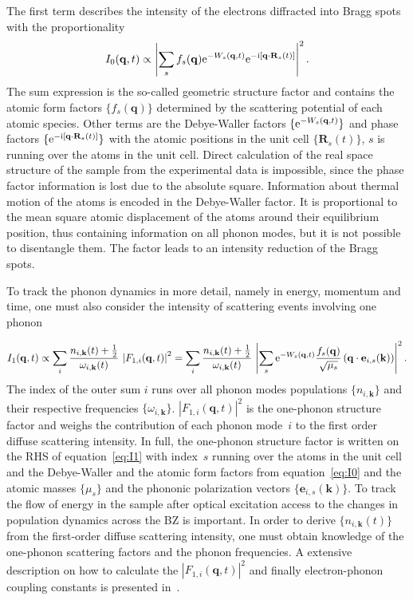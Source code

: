 The first term describes the intensity of the electrons diffracted into Bragg spots with the proportionality
\begin{equation} I_0(\mathbf{q}, t) \propto \left| \sum_s f_s(\mathbf{q}) \mathrm{e}^{-W_s(\mathbf{q},t)} \mathrm{e}^{-\mathrm{i}[\mathbf{q}\cdot\mathbf{R}_s(t)]} \right| ^2.\label{eq:I0}\end{equation}
The sum expression is the so-called geometric structure factor and contains the atomic form factors $\{f_s(\mathbf{q})\}$ determined by the scattering potential of each atomic species.
Other terms are the Debye-Waller factors $\{\mathrm{e}^{-W_s(\mathbf{q},t)}\}$ and phase factors $\{\mathrm{e}^{-\mathrm{i}[\mathbf{q}\cdot\mathbf{R}_s(t)]}\}$ with the atomic positions in the unit cell $\{\mathbf{R}_s(t)\}$, $s$ is running over the atoms in the unit cell.
Direct calculation of the real space structure of the sample from the experimental data is impossible, since the phase factor information is lost due to the absolute square.
Information about thermal motion of the atoms is encoded in the Debye-Waller factor.
It is proportional to the mean square atomic displacement of the atoms around their equilibrium position, thus containing information on all phonon modes, but it is not possible to disentangle them.
The factor leads to an intensity reduction of the Bragg spots.

To track the phonon dynamics in more detail, namely in energy, momentum and time, one must also consider the intensity of scattering events involving one phonon

\begin{equation} I_1(\mathbf{q},t) \propto \sum_i \frac{n_{i,\mathbf{k}}(t)+\frac{1}{2}}{\omega_{i,\mathbf{k}}(t)}\,\left| F_{1,i}(\mathbf{q},t) \right|^2 = \sum_i \frac{n_{i,\mathbf{k}}(t)+\frac{1}{2}}{\omega_{i,\mathbf{k}}(t)}\,\left| \sum_s \mathrm{e}^{-W_s(\mathbf{q},t)} \frac{f_s(\mathbf{q})}{\sqrt{\mu_s}} \left( \mathbf{q}\cdot\mathbf{e}_{i, s}(\mathbf{k}) \right) \right|^2.\label{eq:I1}\end{equation}
The index of the outer sum $i$ runs over all phonon modes populations $\{n_{i,\mathbf{k}}\}$ and their respective frequencies $\{\omega_{i,\mathbf{k}}\}$.
$\left| F_{1,i}(\mathbf{q},t) \right|^2$ is the one-phonon structure factor and weighs the contribution of each phonon mode~$i$ to the first order diffuse scattering intensity.
In full, the one-phonon structure factor is written on the RHS of equation~\ref{eq:I1} with index~$s$ running over the atoms in the unit cell and the Debye-Waller and the atomic form factors from equation~\ref{eq:I0} and the atomic masses $\{\mu_s\}$ and the phononic polarization vectors $\{\mathbf{e}_{i, s}(\mathbf{k})\}$.
To track the flow of energy in the sample after optical excitation access to the changes in population dynamics across the \ac{BZ} is important.
In order to derive $\{n_{i,\mathbf{k}}(t)\}$ from the first-order diffuse scattering intensity, one must obtain knowledge of the one-phonon scattering factors and the phonon frequencies.
A extensive description on how to calculate the $\left| F_{1,i}(\mathbf{q},t) \right|^2$ and finally electron-phonon coupling constants is presented in~\cite{stern2018,renedecotret2019}.

